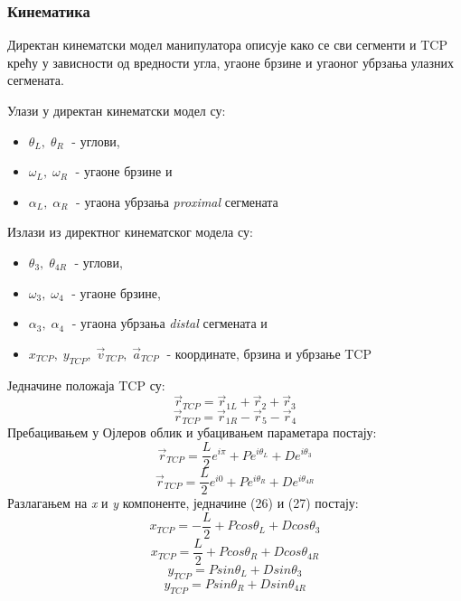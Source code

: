 \documentclass[12pt]{article}
\begin{document}
\subsubsection{Кинематика}
Директан кинематски модел манипулатора описује како се сви сегменти и TCP крећу у зависности од вредности угла, угаоне брзине и угаоног убрзања улазних сегмената.

Улази у директан кинематски модел су:
\begin{itemize}
    \item $\theta_L, \; \theta_R\;$ - углови,
    \item $\omega_L, \; \omega_R\;$ - угаоне брзине и
    \item $\alpha_L, \; \alpha_R\;$ - угаона убрзања \textit{proximal} сегмената
\end{itemize}
Излази из директног кинематског модела су:
\begin{itemize}
    \item $\theta_3, \; \theta_{4R}\;$ - углови,
    \item $\omega_3, \; \omega_4\;$ - угаоне брзине,
    \item $\alpha_3, \; \alpha_4\;$ - угаона убрзања \textit{distal} сегмената и
    \item $x_{TCP},\;y_{TCP},\; \vec{v}_{TCP},\; \vec{a}_{TCP}\;$ - координате, брзина и убрзање TCP
\end{itemize}

Једначине положаја TCP су:
\begin{equation}
    \vec{r}_{TCP} = \vec{r}_{1L} + \vec{r}_2 + \vec{r}_3
\end{equation}
\begin{equation}
    \vec{r}_{TCP} = \vec{r}_{1R} - \vec{r}_5 - \vec{r}_4
\end{equation}
Пребацивањем у Ојлеров облик и убацивањем параметара постају:
\begin{equation}
    \vec{r}_{TCP} = \dfrac{L}{2}e^{i\pi} + Pe^{i\theta_L} + De^{i\theta_3}
\end{equation}
\begin{equation}
    \vec{r}_{TCP} = \dfrac{L}{2}e^{i0} + Pe^{i\theta_R} + De^{i\theta_{4R}}
\end{equation}
Разлагањем на \textit{x} и \textit{y} компоненте, једначине (26) и (27) постају:
\begin{equation}
    x_{TCP} = -\dfrac{L}{2} + Pcos\theta_L + Dcos\theta_3
\end{equation}
\begin{equation}
    x_{TCP} = \dfrac{L}{2} + Pcos\theta_R + Dcos\theta_{4R}
\end{equation}
\begin{equation}
    y_{TCP} = Psin\theta_L + Dsin\theta_3
\end{equation}
\begin{equation}
    y_{TCP} = Psin\theta_R + Dsin\theta_{4R}
\end{equation}
\end{document}
